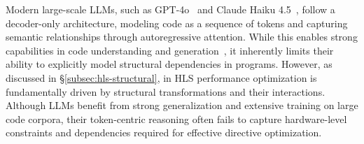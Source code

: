 Modern large-scale LLMs, such as GPT-4o~\cite{openai2023gpt4} and Claude Haiku 4.5~\cite{anthropic2024claude3}, follow a decoder-only architecture, modeling code as a sequence of tokens and capturing semantic relationships through autoregressive attention. 
While this enables strong capabilities in code understanding and generation~\cite{chang2024survey}, it inherently limits their ability to explicitly model structural dependencies in programs.
However, as discussed in \S\ref{subsec:hls-structural}, in HLS performance optimization is fundamentally driven by structural transformations and their interactions. 
Although LLMs benefit from strong generalization and extensive training on large code corpora, their token-centric reasoning often fails to capture hardware-level constraints and dependencies required for effective directive optimization.


